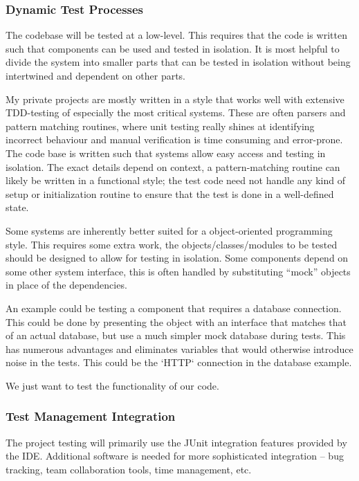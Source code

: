 \subsubsection{Dynamic Test Processes}
The codebase will be tested at a low-level. This requires that the code is
written such that components can be used and tested in isolation.
It is most helpful to divide the system into smaller parts that can be tested
in isolation without being intertwined and dependent on other parts.

My private projects are mostly written in a style that works well with
extensive TDD-testing of especially the most critical systems. These are often
parsers and pattern matching routines, where unit testing really shines at
identifying incorrect behaviour and manual verification is time consuming and
error-prone. The code base is written such that systems allow easy access
and testing in isolation. The exact details depend on context, a pattern-matching
routine can likely be written in a functional style; the test code need not
handle any kind of setup or initialization routine to ensure that the test
is done in a well-defined state. 

Some systems are inherently better suited for a object-oriented programming
style.  This requires some extra work, the objects/classes/modules to be tested
should be designed to allow for testing in isolation. Some components depend on
some other system interface, this is often handled by substituting ``mock''
objects in place of the dependencies. 

An example could be testing a component that requires a database connection.
This could be done by presenting the object with an interface that matches that
of an actual database, but use a much simpler mock database during tests. This
has numerous advantages and eliminates variables that would otherwise introduce
noise in the tests. This could be the `HTTP` connection in the database
example.

We just want to test the functionality of our code.


\subsubsection{Test Management Integration}
The project testing will primarily use the JUnit integration features provided by the IDE.
Additional software is needed for more sophisticated integration -- bug
tracking, team collaboration tools, time management, etc.

